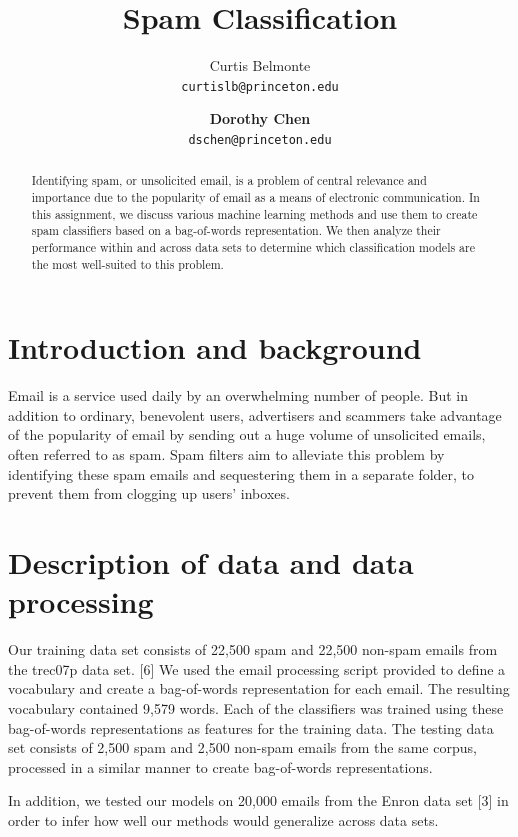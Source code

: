 \documentclass{article} %
\title{Spam Classification}
\author{Curtis Belmonte\\
{\tt\small curtislb@princeton.edu}
\and
\textbf{Dorothy Chen}\\
{\tt\small dschen@princeton.edu}
}
\begin{document}
\maketitle

\begin{abstract}
Identifying spam, or unsolicited email, is a problem of central relevance and importance due to the popularity of email as a means of electronic communication. In this assignment, we discuss various machine learning methods and use them to create spam classifiers based on a bag-of-words representation. We then analyze their performance within and across data sets to determine which classification models are the most well-suited to this problem. 
\end{abstract}

\section{Introduction and background}
Email is a service used daily by an overwhelming number of people. But in addition to ordinary, benevolent users, advertisers and scammers take advantage of the popularity of email by sending out a huge volume of unsolicited emails, often referred to as spam. Spam filters aim to alleviate this problem by identifying these spam emails and sequestering them in a separate folder, to prevent them from clogging up users' inboxes.

\section{Description of data and data processing}
Our training data set consists of 22,500 spam and 22,500 non-spam emails from the trec07p data set. [6] We used the email processing script provided to define a vocabulary and create a bag-of-words representation for each email. The resulting vocabulary contained 9,579 words. Each of the classifiers was trained using these bag-of-words representations as features for the training data. The testing data set consists of 2,500 spam and 2,500 non-spam emails from the same corpus, processed in a similar manner to create bag-of-words representations. 

In addition, we tested our models on 20,000 emails from the Enron data set [3] in order to infer how well our methods would generalize across data sets. 
\end{document}

